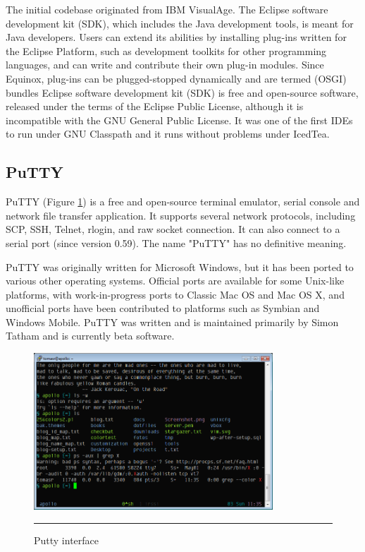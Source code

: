 The initial codebase originated from IBM VisualAge. The Eclipse software development kit (SDK), which includes the Java development tools, is meant for Java developers. Users can extend its abilities by installing plug-ins written for the Eclipse Platform, such as development toolkits for other programming languages, and can write and contribute their own plug-in modules. Since Equinox, plug-ins can be plugged-stopped dynamically and are termed (OSGI) bundles Eclipse software development kit (SDK) is free and open-source software, released under the terms of the Eclipse Public License, although it is incompatible with the GNU General Public License. It was one of the first IDEs to run under GNU Classpath and it runs without problems under IcedTea.

\subsection{PuTTY}
PuTTY (Figure \ref{fig:putty}) is a free and open-source terminal emulator, serial console and network file transfer application. It supports several network protocols, including SCP, SSH, Telnet, rlogin, and raw socket connection. It can also connect to a serial port (since version 0.59). The name "PuTTY" has no definitive meaning.
\newline

PuTTY was originally written for Microsoft Windows, but it has been ported to various other operating systems. Official ports are available for some Unix-like platforms, with work-in-progress ports to Classic Mac OS and Mac OS X, and unofficial ports have been contributed to platforms such as Symbian and Windows Mobile.
PuTTY was written and is maintained primarily by Simon Tatham and is currently beta software.
\begin{figure}[h!]
	\centering
	\vspace{-0.2cm}
	\includegraphics[width=0.8\textwidth]{./images/putty_tango.png}
	\rule{1\textwidth}{1pt}
	\caption{Putty interface}
	\label{fig:putty}
\end{figure}
\newline


